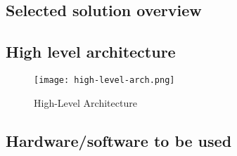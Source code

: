 \documentclass[../main.tex]{subfiles}
\begin{document}
\subsection{Selected solution overview}




\subsection{High level architecture}

\begin{figure}[H]
	\centering
	\texttt{[image: high-level-arch.png]}
	\caption{High-Level Architecture}\label{fig:arch-fig}
\end{figure}


\subsection{Hardware/software to be used}
\end{document}
